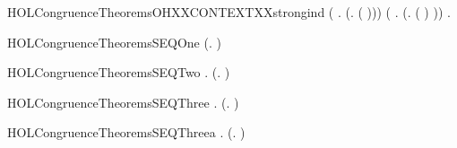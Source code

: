 \begin{SaveVerbatim}{HOLCongruenceTheoremsOHXXCONTEXTXXstrongind}
       (\HOLSymConst{\HOLTokenForall{}} .
              \HOLSymConst{\HOLTokenConj{}}   \HOLSymConst{\HOLTokenImp{}}
             (\HOLTokenLambda{}. \HOLConst{\ensuremath{\nu}}  ( ))) \HOLSymConst{\HOLTokenConj{}}
       (\HOLSymConst{\HOLTokenForall{}} .
              \HOLSymConst{\HOLTokenConj{}}   \HOLSymConst{\HOLTokenImp{}}
             (\HOLTokenLambda{}.  ( ) )) \HOLSymConst{\HOLTokenImp{}}
       \HOLSymConst{\HOLTokenForall{}}.   \HOLSymConst{\HOLTokenImp{}}  
\end{SaveVerbatim}
\newcommand{\HOLCongruenceTheoremsOHXXCONTEXTXXstrongind}{\UseVerbatim{HOLCongruenceTheoremsOHXXCONTEXTXXstrongind}}
\begin{SaveVerbatim}{HOLCongruenceTheoremsSEQOne}
\HOLTokenTurnstile{}  (\HOLTokenLambda{}. )
\end{SaveVerbatim}
\newcommand{\HOLCongruenceTheoremsSEQOne}{\UseVerbatim{HOLCongruenceTheoremsSEQOne}}
\begin{SaveVerbatim}{HOLCongruenceTheoremsSEQTwo}
\HOLTokenTurnstile{} \HOLSymConst{\HOLTokenForall{}}.  (\HOLTokenLambda{}. )
\end{SaveVerbatim}
\newcommand{\HOLCongruenceTheoremsSEQTwo}{\UseVerbatim{HOLCongruenceTheoremsSEQTwo}}
\begin{SaveVerbatim}{HOLCongruenceTheoremsSEQThree}
\HOLTokenTurnstile{} \HOLSymConst{\HOLTokenForall{}} .   \HOLSymConst{\HOLTokenImp{}}  (\HOLTokenLambda{}.  )
\end{SaveVerbatim}
\newcommand{\HOLCongruenceTheoremsSEQThree}{\UseVerbatim{HOLCongruenceTheoremsSEQThree}}
\begin{SaveVerbatim}{HOLCongruenceTheoremsSEQThreea}
\HOLTokenTurnstile{} \HOLSymConst{\HOLTokenForall{}}.  (\HOLTokenLambda{}. )
\end{SaveVerbatim}
